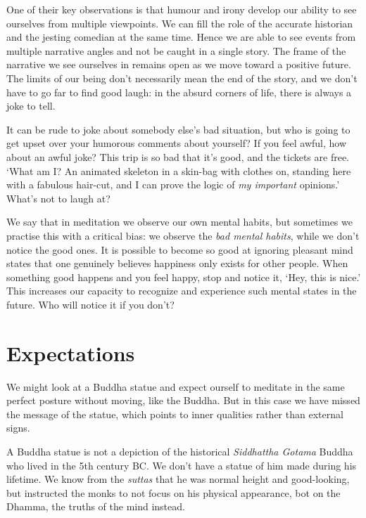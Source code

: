 One of their key observations is that humour and irony develop our
ability to see ourselves from multiple viewpoints. We can fill the role
of the accurate historian and the jesting comedian at the same time.
Hence we are able to see events from multiple narrative angles and not
be caught in a single story. The frame of the narrative we see ourselves
in remains open as we move toward a positive future. The limits of our
being don't necessarily mean the end of the story, and we don't have to
go far to find good laugh: in the absurd corners of life, there is
always a joke to tell.

It can be rude to joke about somebody else's bad situation, but who is
going to get upset over your humorous comments about yourself? If you
feel awful, how about an awful joke? This trip is so bad that it's good,
and the tickets are free. `What am I? An animated skeleton in a skin-bag
with clothes on, standing here with a fabulous hair-cut, and I can prove
the logic of \emph{my important} opinions.' What's not to laugh at?

\enlargethispage*{\baselineskip}

We say that in meditation we observe our own mental habits, but
sometimes we practise this with a critical bias: we observe the
\emph{bad mental habits}, while we don't notice the good ones. It is
possible to become so good at ignoring pleasant mind states that one
genuinely believes happiness only exists for other people. When
something good happens and you feel happy, stop and notice it, `Hey,
this is nice.' This increases our capacity to recognize and experience
such mental states in the future. Who will notice it if you don't?

\section{Expectations}


\noindent We might look at a Buddha statue and expect ourself to
meditate in the same perfect posture without moving, like the Buddha.
But in this case we have missed the message of the statue, which points
to inner qualities rather than external signs.

A Buddha statue is not a depiction of the historical \emph{Siddhattha
Gotama} Buddha who lived in the 5th century BC. We don't have a statue
of him made during his lifetime. We know from the \emph{suttas} that he
was normal height and good-looking, but instructed the monks to not
focus on his physical appearance, bot on the Dhamma, the truths of the
mind instead.


